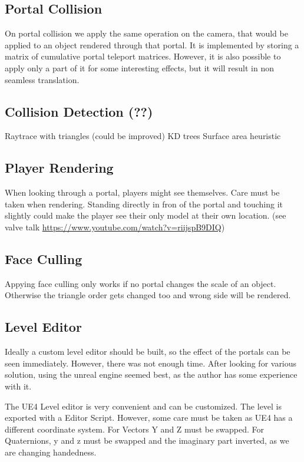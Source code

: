 \subsection{Portal Collision}
On portal collision we apply the same operation on the camera, that would be applied to an object rendered through that portal.
It is implemented by storing a matrix of cumulative portal teleport matrices.
However, it is also possible to apply only a part of it for some interesting effects, but it will result in non seamless translation.

\subsection{Collision Detection (??)}
Raytrace with triangles (could be improved)
KD trees
Surface area heuristic

\subsection{Player Rendering}
When looking through a portal, players might see themselves. Care must be taken when rendering. Standing directly in fron of the portal and touching it slightly could make the player see their only model at their own location. (see valve talk \url{https://www.youtube.com/watch?v=riijspB9DIQ})



\subsection{Face Culling}
Appying face culling only works if no portal changes the scale of an object. Otherwise the triangle order gets changed too and wrong side will be rendered.

\subsection{Level Editor}
Ideally a custom level editor should be built, so the effect of the portals can be seen immediately. However, there was not enough time. After looking for various solution, using the unreal engine seemed best, as the author has some experience with it.

The UE4 Level editor is very convenient and can be customized. The level is exported with a Editor Script. However, some care must be taken as UE4 has a different coordinate system. For Vectors Y and Z must be swapped. For Quaternions, y and z must be swapped and the imaginary part inverted, as we are changing handedness.


